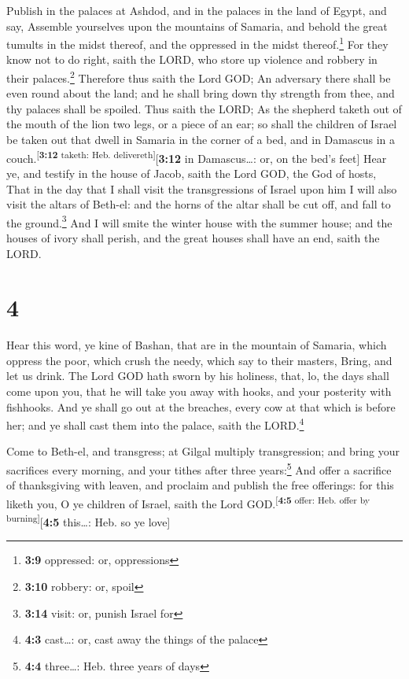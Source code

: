  Publish in the palaces at Ashdod, and in the palaces in
the land of Egypt, and say, Assemble yourselves upon the mountains of
Samaria, and behold the great tumults in the midst thereof, and the
oppressed in the midst thereof.\footnote{\textbf{3:9} oppressed: or,
  oppressions}  For they know not to do right, saith the
LORD, who store up violence and robbery in their palaces.\footnote{\textbf{3:10}
  robbery: or, spoil}  Therefore thus saith the Lord GOD;
An adversary there shall be even round about the land; and he shall
bring down thy strength from thee, and thy palaces shall be spoiled.
 Thus saith the LORD; As the shepherd taketh out of the
mouth of the lion two legs, or a piece of an ear; so shall the children
of Israel be taken out that dwell in Samaria in the corner of a bed, and
in Damascus in a couch.\textsuperscript{{[}\textbf{3:12} taketh: Heb.
delivereth{]}}{[}\textbf{3:12} in Damascus\ldots: or, on the bed's
feet{]}  Hear ye, and testify in the house of Jacob,
saith the Lord GOD, the God of hosts,  That in the day
that I shall visit the transgressions of Israel upon him I will also
visit the altars of Beth-el: and the horns of the altar shall be cut
off, and fall to the ground.\footnote{\textbf{3:14} visit: or, punish
  Israel for}  And I will smite the winter house with the
summer house; and the houses of ivory shall perish, and the great houses
shall have an end, saith the LORD.

\hypertarget{section-3}{%
\section{4}\label{section-3}}

 Hear this word, ye kine of Bashan, that are in the
mountain of Samaria, which oppress the poor, which crush the needy,
which say to their masters, Bring, and let us drink.  The
Lord GOD hath sworn by his holiness, that, lo, the days shall come upon
you, that he will take you away with hooks, and your posterity with
fishhooks.  And ye shall go out at the breaches, every cow
at that which is before her; and ye shall cast them into the palace,
saith the LORD.\footnote{\textbf{4:3} cast\ldots: or, cast away the
  things of the palace}

 Come to Beth-el, and transgress; at Gilgal multiply
transgression; and bring your sacrifices every morning, and your tithes
after three years:\footnote{\textbf{4:4} three\ldots: Heb. three years
  of days}  And offer a sacrifice of thanksgiving with
leaven, and proclaim and publish the free offerings: for this liketh
you, O ye children of Israel, saith the Lord
GOD.\textsuperscript{{[}\textbf{4:5} offer: Heb. offer by
burning{]}}{[}\textbf{4:5} this\ldots: Heb. so ye love{]}

